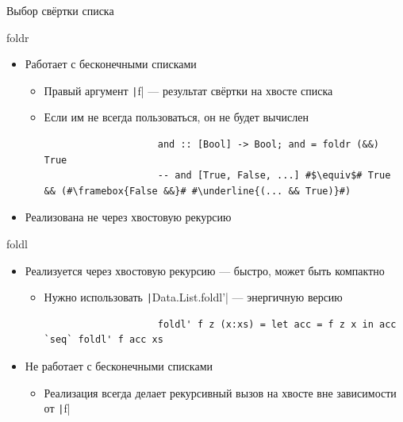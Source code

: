     \begin{frame}[fragile]{Выбор свёртки списка \practicalslide}
        \pause
        \begin{block}{foldr}
            \begin{itemize}
                \item[\positive] Работает с бесконечными списками
                \begin{itemize}
                    \item Правый аргумент \texttt|f| --- результат свёртки на хвосте списка
                    \item Если им не всегда пользоваться, он не будет вычислен
                    \begin{verbatim}
                    and :: [Bool] -> Bool; and = foldr (&&) True
                    -- and [True, False, ...] #$\equiv$# True && (#\framebox{False &&}# #\underline{(... && True)}#)
                    \end{verbatim}
                \end{itemize}
                \item[\negative] Реализована не через хвостовую рекурсию
            \end{itemize}
        \end{block}
        \begin{block}{foldl}
            \begin{itemize}
                \item[\positive] Реализуется через хвостовую рекурсию --- быстро, может быть компактно
                \begin{itemize}
                    \item Нужно использовать \texttt|Data.List.foldl'| --- энергичную версию
                    \begin{verbatim}
                    foldl' f z (x:xs) = let acc = f z x in acc `seq` foldl' f acc xs
                    \end{verbatim}
                \end{itemize}
                \item[\negative] Не работает с бесконечными списками
                \begin{itemize}
                    \item Реализация всегда делает рекурсивный вызов на хвосте вне зависимости от \texttt|f|
                \end{itemize}
            \end{itemize}
        \end{block}
    \end{frame}

